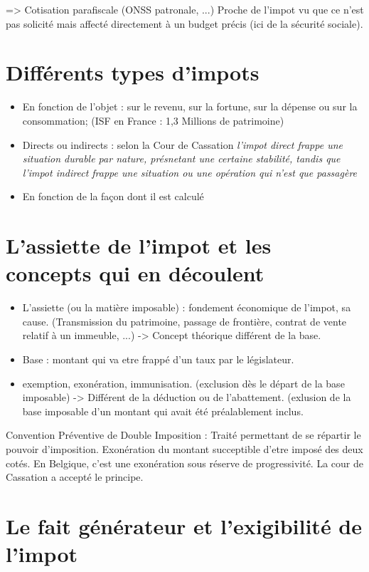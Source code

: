 \documentclass{book}
\begin{document}
=> Cotisation parafiscale (ONSS patronale, ...) Proche de l'impot vu que ce n'est pas solicité mais affecté directement à un budget précis (ici de la sécurité sociale).

\section{Différents types d'impots}


\begin{itemize}
\item En fonction de l'objet : sur le revenu, sur la fortune, sur la dépense ou sur la consommation; (ISF en France : 1,3 Millions de patrimoine)
\item Directs ou indirects : selon la Cour de Cassation \textit{l'impot direct frappe une situation durable par nature, présnetant une certaine stabilité, tandis que l'impot indirect frappe une situation ou une opération qui n'est que passagère}
\item En fonction de la façon dont il est calculé

\end{itemize}

\section{L'assiette de l'impot et les concepts qui en découlent}

\begin{itemize}
\item L'assiette (ou la matière imposable) : fondement économique de l'impot, sa cause. (Transmission du patrimoine, passage de frontière, contrat de vente relatif à un immeuble, ...) -> Concept théorique différent de la base.
\item Base : montant qui va etre frappé d'un taux par le législateur.
\item exemption, exonération, immunisation. (exclusion dès le départ de la base imposable) -> Différent de la déduction ou de l'abattement. (exlusion de la base imposable d'un montant qui avait été préalablement inclus.
\end{itemize}

Convention Préventive de Double Imposition : Traité permettant de se répartir le pouvoir d'imposition. Exonération du montant succeptible d'etre imposé des deux cotés. En Belgique, c'est une exonération sous réserve de progressivité. La cour de Cassation a accepté le principe.

\section{Le fait générateur et l'exigibilité de l'impot}
\end{document}
